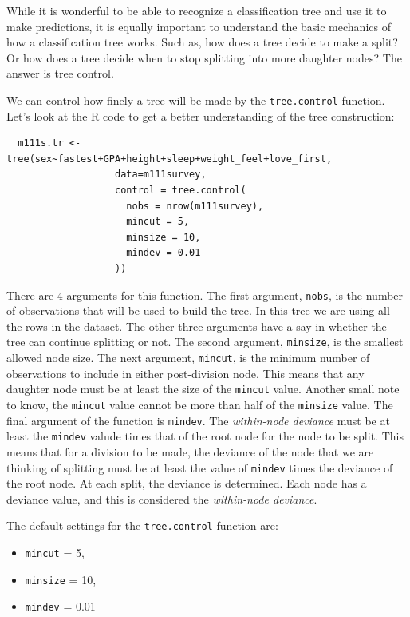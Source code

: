\documentclass[12pt,twoside]{reedthesis}
\providecommand{\tightlist}{%
  \setlength{\itemsep}{0pt}\setlength{\parskip}{0pt}}
\begin{document}
  While it is wonderful to be able to recognize a classification tree and
  use it to make predictions, it is equally important to understand the
  basic mechanics of how a classification tree works. Such as, how does a
  tree decide to make a split? Or how does a tree decide when to stop
  splitting into more daughter nodes? The answer is tree control.
  
  We can control how finely a tree will be made by the
  \texttt{tree.control} function. Let's look at the R code to get a better
  understanding of the tree construction:
  
  \begin{verbatim}
  m111s.tr <- tree(sex~fastest+GPA+height+sleep+weight_feel+love_first,
                   data=m111survey,
                   control = tree.control(
                     nobs = nrow(m111survey),
                     mincut = 5,
                     minsize = 10,
                     mindev = 0.01
                   ))
  \end{verbatim}
  
  There are 4 arguments for this function. The first argument,
  \texttt{nobs}, is the number of observations that will be used to build
  the tree. In this tree we are using all the rows in the dataset. The
  other three arguments have a say in whether the tree can continue
  splitting or not. The second argument, \texttt{minsize}, is the smallest
  allowed node size. The next argument, \texttt{mincut}, is the minimum
  number of observations to include in either post-division node. This
  means that any daughter node must be at least the size of the
  \texttt{mincut} value. Another small note to know, the \texttt{mincut}
  value cannot be more than half of the \texttt{minsize} value. The final
  argument of the function is \texttt{mindev}. The \emph{within-node
  deviance} must be at least the \texttt{mindev} valude times that of the
  root node for the node to be split. This means that for a division to be
  made, the deviance of the node that we are thinking of splitting must be
  at least the value of \texttt{mindev} times the deviance of the root
  node. At each split, the deviance is determined. Each node has a
  deviance value, and this is considered the \emph{within-node deviance}.
  
  The default settings for the \texttt{tree.control} function are:
  
  \begin{itemize}
  \tightlist
  \item
    \texttt{mincut} = 5,
  \item
    \texttt{minsize} = 10,
  \item
    \texttt{mindev} = 0.01
  \end{itemize}
  
\end{document}
